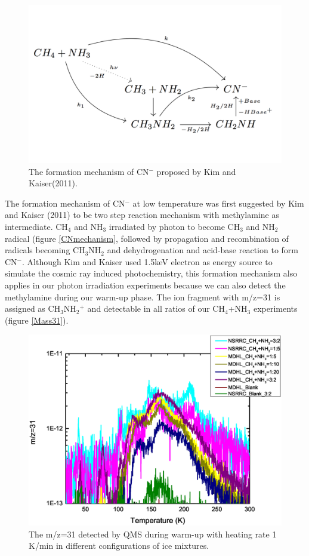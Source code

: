 \begin{figure}
\centering
\includegraphics[width=\textwidth]{figures/chapter3/CNmechanism}
\caption{The formation mechanism of CN$^-$ proposed by Kim and Kaiser(2011). }
\label{fig:CNmechanism}
\end{figure}

The formation mechanism of CN$^-$ at low temperature was first suggested by Kim and Kaiser (2011) to be two step reaction mechanism with methylamine as intermediate. CH$_4$ and NH$_3$ irradiated by photon to become CH$_3$ and NH$_2$ radical (figure \ref{CNmechanism}, followed by propagation and recombination of radicals becoming CH$_3$NH$_2$ and dehydrogenation and acid-base reaction to form CN$^-$.
Although Kim and Kaiser used 1.5keV electron as energy source to simulate the cosmic ray induced photochemistry, this formation mechanism also applies in our photon irradiation experiments because we can also detect the methylamine during our warm-up phase. The ion fragment with m/z=31 is assigned as CH$_3$NH$_2$$^+$ and detectable in all ratios of our CH$_4$+NH$_3$ experiments (figure \ref{Mass31}).

\begin{figure}
\centering
\includegraphics[width=\textwidth]{figures/chapter3/Mass31.eps}
\caption{The m/z=31 detected by QMS during warm-up with heating rate 1 K/min in different configurations of ice mixtures.}
\label{fig:CNmechanism}
\end{figure}

